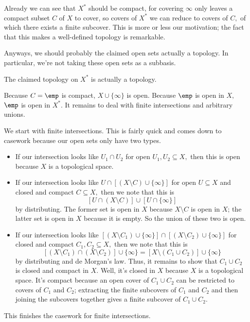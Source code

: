 Already we can see that $X^*$ should be compact, for covering $\infty$ only leaves a compact subset $C$ of $X$ to cover, so covers of $X^*$ we can reduce to covers of $C,$ of which there exists a finite subcover. This is more or less our motivation; the fact that this makes a well-defined topology is remarkable.

Anyways, we should probably the claimed open sets actually a topology. In particular, we're not taking these open sets as a subbasis.
\begin{proposition}
    The claimed topology on $X^*$ is actually a topology.
\end{proposition}
Because $C=\emp$ is compact, $X\cup\{\infty\}$ is open. Because $\emp$ is open in $X,$ $\emp$ is open in $X^*.$ It remains to deal with finite intersections and arbitrary unions.

We start with finite intersections. This is fairly quick and comes down to casework because our open sets only have two types.
\begin{itemize}
    \item If our intersection looks like $U_1\cap U_2$ for open $U_1,U_2\subseteq X,$ then this is open because $X$ is a topological space.
    \item If our intersection looks like $U\cap[(X\setminus C)\cup\{\infty\}]$ for open $U\subseteq X$ and closed and compact $C\subseteq X,$ then we note that this is
    \[[U\cap(X\setminus C)]\cup[U\cap\{\infty\}]\]
    by distributing. The former set is open in $X$ because $X\setminus C$ is open in $X$; the latter set is open in $X$ because it is empty. So the union of these two is open.
    \item If our intersection looks like $[(X\setminus C_1)\cup\{\infty\}]\cap[(X\setminus C_2)\cup\{\infty\}]$ for closed and compact $C_1,C_2\subseteq X,$ then we note that this is
    \[[(X\setminus C_1)\cap(X\setminus C_2)]\cup\{\infty\}=[X\setminus(C_1\cup C_2)]\cup\{\infty\}\]
    by distributing and de Morgan's law. Thus, it remains to show that $C_1\cup C_2$ is closed and compact in $X.$ Well, it's closed in $X$ because $X$ is a topological space. It's compact because an open cover of $C_1\cup C_2$ can be restricted to covers of $C_1$ and $C_2$; extracting the finite subcovers of $C_1$ and $C_2$ and then joining the subcovers together gives a finite subcover of $C_1\cup C_2.$
\end{itemize}
This finishes the casework for finite intersections.

